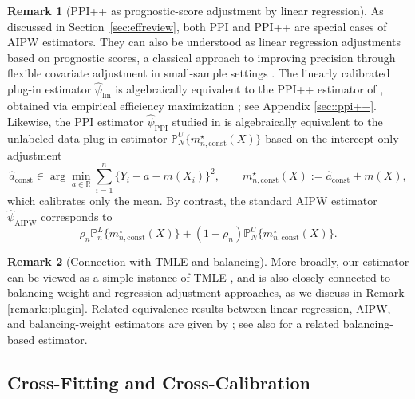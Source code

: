 \documentclass{article}
\theoremstyle{plain}
\theoremstyle{definition}
\newtheorem{remark}{Remark}
\newcommand{\R}{\mathbb{R}}
\newcommand{\1}{\mathbbm{1}}
\newcommand{\mhat}{m}
\begin{document}
 
\begin{remark}[PPI++ as prognostic-score adjustment by linear regression]
As discussed in Section~\ref{sec:effreview}, both PPI and PPI++ are special cases of AIPW estimators. They can also be understood as linear regression adjustments based on prognostic scores, a classical approach to improving precision through flexible covariate adjustment in small-sample settings \citep{hansen2008prognostic,rosenblum2009using,lin2013agnostic,schuler2022increasing,hojbjerre2025powering}. The linearly calibrated plug-in estimator \(\widehat{\psi}_{\mathrm{lin}}\) is algebraically equivalent to the PPI++ estimator of \citet{angelopoulos2023ppi}, obtained via empirical efficiency maximization \citep{rubin2008empirical}; see Appendix \ref{sec::ppi++}. Likewise, the PPI estimator \(\widehat{\psi}_{\mathrm{PPI}}\) studied in \citet{angelopoulos2023ppi} is algebraically equivalent to the unlabeled-data plug-in estimator \(\mathbb{P}_N^U\{m_{n,\mathrm{const}}^\star(X)\}\) based on the intercept-only adjustment
\begin{equation}
\label{eq:const-cal}
\hat a_{\mathrm{const}} \in \arg\min_{a\in\R}\sum_{i=1}^n \{Y_i-a-\mhat(X_i)\}^2,
\qquad
m_{n,\mathrm{const}}^\star(X):=\hat a_{\mathrm{const}}+\mhat(X),
\end{equation}
which calibrates only the mean. By contrast, the standard AIPW estimator \(\widehat{\psi}_{\mathrm{AIPW}}\) corresponds to
\[
\rho_n \mathbb{P}_n^L\{m_{n,\mathrm{const}}^\star(X)\} + (1-\rho_n)\mathbb{P}_N^U\{m_{n,\mathrm{const}}^\star(X)\}.
\]
\end{remark}


\begin{remark}[Connection with TMLE and balancing]
More broadly, our estimator can be viewed as a simple instance of TMLE \citep{van2006targeted,lendle2015balancing,hejazi2023revisiting,van2025automatic}, and is also closely connected to balancing-weight and regression-adjustment approaches, as we discuss in Remark \ref{remark::plugin}. Related equivalence results between linear regression, AIPW, and balancing-weight estimators are given by \citet{chattopadhyay2023implied,bruns2025augmented}; see also \citet{lee2026mec} for a related balancing-based estimator.
\end{remark}

 


\subsection{Cross-Fitting and Cross-Calibration}
\label{sec:crossfit}
\end{document}
